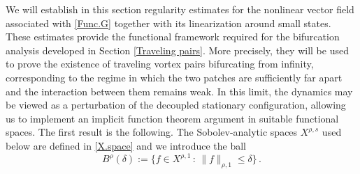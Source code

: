 \documentclass[a4paper,reqno,10pt]{article}
\begin{document}
We will establish in  this section  regularity estimates for the nonlinear vector field associated with \eqref{Func.G} together with its linearization around small states. 
These estimates provide the functional framework required for the bifurcation analysis developed in Section \ref{Traveling pairs}. More precisely, they will be used to prove the existence of traveling vortex pairs bifurcating from infinity, corresponding to the regime in which the two patches are sufficiently far apart and the interaction between them remains weak. In this limit, the dynamics may be viewed as a perturbation of the decoupled stationary configuration, allowing us to implement an implicit function theorem argument in suitable functional spaces.
The first result is the following. The Sobolev-analytic spaces $X^{\rho,s}$ used below are defined in \eqref{X.space} and we introduce the ball
\begin{equation}
	B^{\rho}(\delta) := \{ f \in X^{\rho,1} \, : \, \| f\|_{\rho,1} \leqslant \delta \}\,.
\end{equation}
\end{document}

